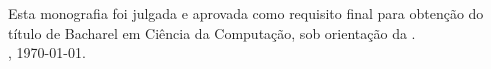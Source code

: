 %
% 
%
\begin{folhadeaprovacao}
  \begin{center}
    {\large \textbf{\MakeUppercase{\imprimirinstituicao}}}\\[2cm]
    {\large \textbf{\textrm{\MakeUppercase{\imprimirtitulo}}}}\\[2cm]
    \begin{flushright}
      {\ABNTEXchapterfont\large \textrm{\imprimirautor}}
    \end{flushright}   

    \vspace{2cm}
    \begin{minipage}{1\textwidth}
      \doublespacing
      Esta monografia foi julgada e aprovada como requisito final para obtenção do título de Bacharel em Ciência da Computação,
      sob orientação da \orientador.\\

      \imprimirlocal, \today.
    \end{minipage}%
    \vspace*{\fill}
   \end{center}
    
\assinatura{\professorConvidadoDois\\\professorConvidadoUm}

\begin{center}
  \vfill
  \large \siglaInstituicao \\ \imprimirlocal \\ \anodeaprovacao
\end{center}

\end{folhadeaprovacao}
\newpage